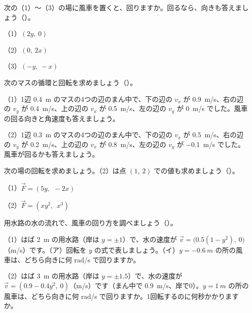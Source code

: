 \bkendproblems
{}

\bkproblem 次の（1）〜（3）の場に風車を置くと、回りますか。回るなら、向きも答えましょう\mbox{（）}。\par
（1）\nobreak $(2y,\ 0)$\par
（2）\nobreak $(0,\ 2x)$\par
（3）\nobreak $(-y,\ -x)$

\bkproblem 次のマスの循環と回転を求めましょう\mbox{（）}。\par
（1）1辺 \qty{0.4}{m} のマスの4つの辺のまん中で、下の辺の $v_x$ が \qty{0.9}{m/s}、右の辺の $v_y$ が \qty{0.4}{m/s}、上の辺の $v_x$ が \qty{0.5}{m/s}、左の辺の $v_y$ が \qty{0}{m/s} でした。風車の回る向きと角速度も答えましょう。\par
（2）1辺 \qty{0.3}{m} のマスの4つの辺のまん中で、下の辺の $v_x$ が \qty{0.5}{m/s}、右の辺の $v_y$ が \qty{0.2}{m/s}、上の辺の $v_x$ が \qty{0.8}{m/s}、左の辺の $v_y$ が \qty{-0.1}{m/s} でした。風車が回るかも答えましょう。

\bkproblem 次の場の回転を求めましょう。（2）は点 $(1,\ 2)$ での値も求めましょう\mbox{（）}。\par
（1）\nobreak $\vec F=(5y,\ \ -2x)$\par
（2）\nobreak $\vec F=(xy^2,\ \ x^3)$

\bkproblem 用水路の水の流れで、風車の回り方を調べましょう\mbox{（）}。\par
（1）はば \qty{2}{m} の用水路（岸は $y=\pm1$）で、水の速度が $\vec v=\bigl(0.5(1-y^2),\ 0\bigr)$（m/s）です。（ア）回転を $y$ の式で表しましょう。（イ）$y=\qty{-0.6}{m}$ の所の風車は、どちら向きに何 rad/s で回りますか。\par
（2）はば \qty{3}{m} の用水路（岸は $y=\pm1.5$）で、水の速度が $\vec v=(0.9-0.4y^2,\ 0)$（m/s）です（まん中で \qty{0.9}{m/s}、岸で0）。$y=\qty{1}{m}$ の所の風車は、どちら向きに何 rad/s で回りますか。1回転するのに何秒かかりますか。

